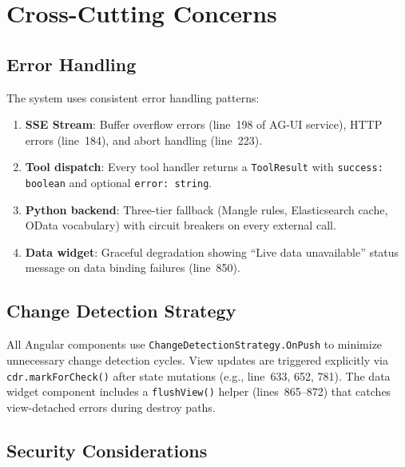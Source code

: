 \documentclass[11pt]{article}
\begin{document}
\section{Cross-Cutting Concerns}
\label{sec:crosscutting}

\subsection{Error Handling}

The system uses consistent error handling patterns:

\begin{enumerate}
  \item \textbf{SSE Stream}: Buffer overflow errors (line~198 of AG-UI
    service), HTTP errors (line~184), and abort handling (line~223).
  \item \textbf{Tool dispatch}: Every tool handler returns a \texttt{ToolResult}
    with \texttt{success: boolean} and optional \texttt{error: string}.
  \item \textbf{Python backend}: Three-tier fallback (Mangle rules,
    Elasticsearch cache, OData vocabulary) with circuit breakers on every
    external call.
  \item \textbf{Data widget}: Graceful degradation showing ``Live data
    unavailable'' status message on data binding failures (line~850).
\end{enumerate}

\subsection{Change Detection Strategy}

All Angular components use \texttt{ChangeDetectionStrategy.OnPush} to minimize
unnecessary change detection cycles. View updates are triggered explicitly via
\texttt{cdr.markForCheck()} after state mutations (e.g., line~633, 652, 781).
The data widget component includes a \texttt{flushView()} helper (lines~865--872)
that catches view-detached errors during destroy paths.

\subsection{Security Considerations}
\end{document}
